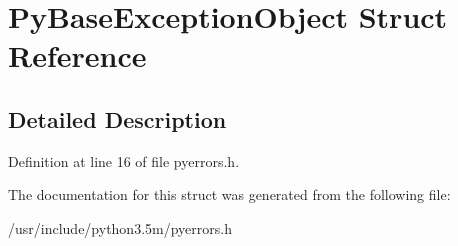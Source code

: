 \hypertarget{structPyBaseExceptionObject}{}\section{Py\+Base\+Exception\+Object Struct Reference}
\label{structPyBaseExceptionObject}


\subsection{Detailed Description}


Definition at line 16 of file pyerrors.\+h.



The documentation for this struct was generated from the following file\+:\begin{DoxyCompactItemize}
\item 
/usr/include/python3.\+5m/pyerrors.\+h\end{DoxyCompactItemize}
